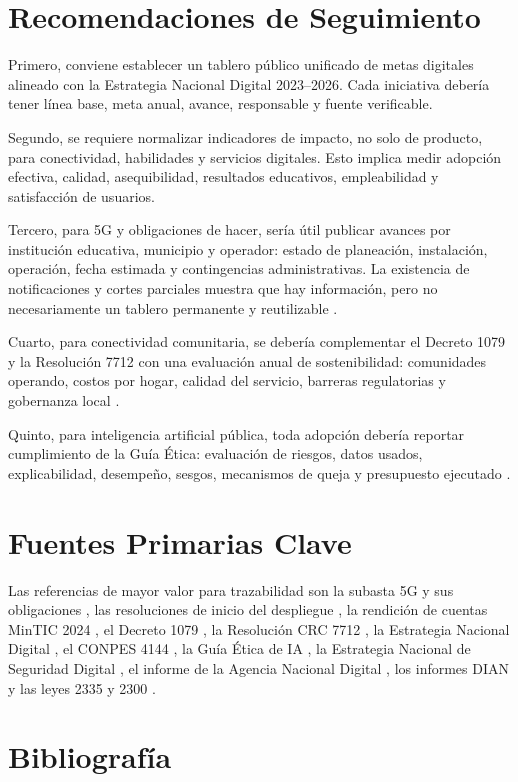 \documentclass[9pt,a4paper,twoside]{rho-class/rho}
\begin{document}
\section{Recomendaciones de Seguimiento}

Primero, conviene establecer un tablero público unificado de metas digitales alineado con la Estrategia Nacional Digital 2023--2026. Cada iniciativa debería tener línea base, meta anual, avance, responsable y fuente verificable.

Segundo, se requiere normalizar indicadores de impacto, no solo de producto, para conectividad, habilidades y servicios digitales. Esto implica medir adopción efectiva, calidad, asequibilidad, resultados educativos, empleabilidad y satisfacción de usuarios.

Tercero, para 5G y obligaciones de hacer, sería útil publicar avances por institución educativa, municipio y operador: estado de planeación, instalación, operación, fecha estimada y contingencias administrativas. La existencia de notificaciones y cortes parciales muestra que hay información, pero no necesariamente un tablero permanente y reutilizable \cite{mintic_escuelas_potencia_5g_2024}.

Cuarto, para conectividad comunitaria, se debería complementar el Decreto 1079 y la Resolución 7712 con una evaluación anual de sostenibilidad: comunidades operando, costos por hogar, calidad del servicio, barreras regulatorias y gobernanza local \cite{funcionpublica_decreto_1079_2023,crc_resolucion_7712_2025}.

Quinto, para inteligencia artificial pública, toda adopción debería reportar cumplimiento de la Guía Ética: evaluación de riesgos, datos usados, explicabilidad, desempeño, sesgos, mecanismos de queja y presupuesto ejecutado \cite{dnp_guia_etica_ia_2025,mintic_guia_etica_ia_2026}.

\section{Fuentes Primarias Clave}

Las referencias de mayor valor para trazabilidad son la subasta 5G y sus obligaciones \cite{mintic_5g_realidad_2023}, las resoluciones de inicio del despliegue \cite{mintic_despliegue_5g_2024}, la rendición de cuentas MinTIC 2024 \cite{mintic_rendicion_cuentas_2024}, el Decreto 1079 \cite{funcionpublica_decreto_1079_2023}, la Resolución CRC 7712 \cite{crc_resolucion_7712_2025}, la Estrategia Nacional Digital \cite{mintic_estrategia_nacional_digital_2023}, el CONPES 4144 \cite{vanegas_conpes_4144_2025}, la Guía Ética de IA \cite{mintic_guia_etica_ia_2026}, la Estrategia Nacional de Seguridad Digital \cite{mintic_seguridad_digital_2025}, el informe de la Agencia Nacional Digital \cite{and_informe_gestion_2024}, los informes DIAN \cite{dian_informe_gestion_2025,dian_cifras_sfe_2026} y las leyes 2335 y 2300 \cite{funcionpublica_ley_2335_2023,funcionpublica_ley_2300_2023}.

\section{Bibliografía}
\printbibliography[heading=none]
\end{document}
